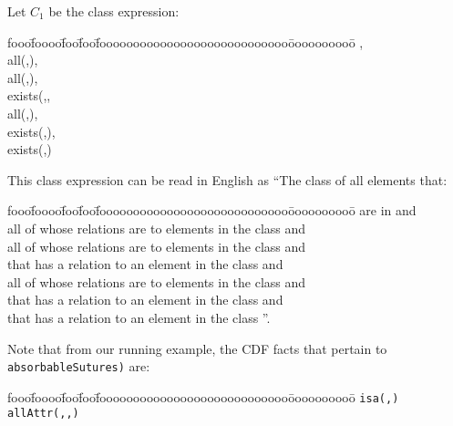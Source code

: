 \begin{example} \label{ex:firstce} \rm
Let $C_1$ be the class expression: 
{\em {\small
\begin{tabbing}
fooo\=foooo\=foo\=foo\=foooooooooooooooooooooooooooo\=oooooooooo\=\kill
\> , \\
\> all(,), \\
\> all(,), \\
\> \> 	exists(,, \\
\> all(,),  \\
\> \> 	exists(,),  \\
\> \> 	exists(,)  
\end{tabbing}
} }
This class expression can be read in English as ``The class of all
elements that: 
\begin{tabbing}
fooo\=foooo\=foo\=foo\=foooooooooooooooooooooooooooo\=oooooooooo\=\kill
\> are in {\tt {}} and \\
\> all of whose {\tt {}} relations are to elements in
the class {\tt {}} and \\
\> all of whose {\tt {}} relations are to elements in
the class {\tt {}} and \\
\> that has a {\tt {}} relation to an element in
the class {\tt {}} and \\
\> all of whose {\tt {}} relations are to elements in
the class {\tt {}} and \\
\> that has a {\tt {}} relation to an element in
the class {\tt {}} and \\
\> that has a {\tt {}} relation to an element in
the class {\tt {}}''.
\end{tabbing}
\noindent
Note that from our running example, the CDF facts that pertain to {\tt
absorbableSutures)} are: 
{\small
\begin{tabbing}
fooo\=foooo\=foo\=foo\=foooooooooooooooooooooooooooo\=oooooooooo\=\kill
\> {\tt isa(,)}  \\
\> {\tt allAttr(,,)} \\

\end{tabbing}}
\end{example}
